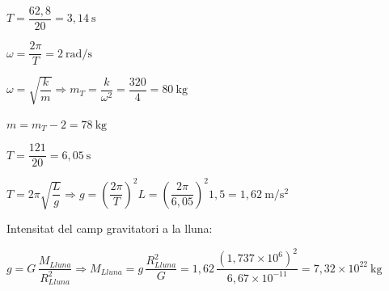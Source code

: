 \begin{solapartat}
 $T = \dfrac{62,8}{20} = 3,14\ \mathrm{s}$

\smallskip
{} $\omega = \dfrac{2\pi}{T} = 2\ \mathrm{rad/s}$

\smallskip
{} $\omega = \sqrt{\dfrac{k}{m}} \Longrightarrow m_T = \dfrac{k}{\omega^2} = \dfrac{320}{4} = 80\ \mathrm{kg}$

\smallskip
{} $m = m_T - 2 = 78\ \mathrm{kg}$
\end{solapartat}

\begin{solapartat}
 $T = \dfrac{121}{20} = 6,05\ \mathrm{s}$

\smallskip
{} $T = 2\pi\sqrt{\dfrac{L}{g}} \Longrightarrow g = \left(\dfrac{2\pi}{T}\right)^2 L = \left(\dfrac{2\pi}{6,05}\right)^2 1,5 = 1,62\ \mathrm{m/s^2}$

\smallskip
Intensitat del camp gravitatori a la lluna:

\smallskip
{} $g = G\,\dfrac{M_{Lluna}}{R_{Lluna}^2} \Rightarrow M_{Lluna} = g\,\dfrac{R_{Lluna}^2}{G} = 1,62\,\dfrac{(1,737\times 10^{6})^2}{6,67\times 10^{-11}} = 7,32\times 10^{22}\ \mathrm{kg}$ \quad{}
\end{solapartat}
